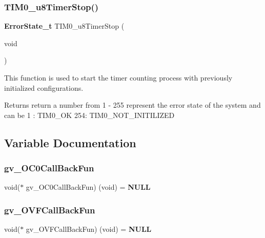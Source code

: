 \subsubsection{T\+I\+M0\+\_\+u8\+Timer\+Stop()}
{\footnotesize\ttfamily \textbf{ Error\+State\+\_\+t} T\+I\+M0\+\_\+u8\+Timer\+Stop (\begin{DoxyParamCaption}\item[{void}]{ }\end{DoxyParamCaption})}



This function is used to start the timer counting process with previously initialized configurations. 

\begin{DoxyReturn}{Returns}
return a number from 1 -\/ 255 represent the error state of the system and can be 1 \+: T\+I\+M0\+\_\+\+OK 254\+: T\+I\+M0\+\_\+\+N\+O\+T\+\_\+\+I\+N\+I\+T\+I\+L\+I\+Z\+ED 
\end{DoxyReturn}


\subsection{Variable Documentation}
\mbox{\label{_t_i_m_e_r0_8c_a20da7068d50d86a94daa669ced6ac2d4}} 
\subsubsection{gv\+\_\+\+O\+C0\+Call\+Back\+Fun}
{\footnotesize\ttfamily void($\ast$ gv\+\_\+\+O\+C0\+Call\+Back\+Fun) (void) =\textbf{ N\+U\+LL}}

\mbox{\label{_t_i_m_e_r0_8c_ac32d3a17adfe2aa7272756899c433654}} 
\subsubsection{gv\+\_\+\+O\+V\+F\+Call\+Back\+Fun}
{\footnotesize\ttfamily void($\ast$ gv\+\_\+\+O\+V\+F\+Call\+Back\+Fun) (void) =\textbf{ N\+U\+LL}}

